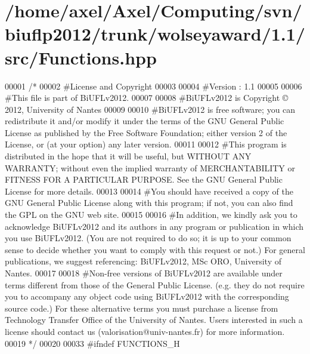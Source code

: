 \hypertarget{Functions_8hpp_source}{\section{/home/axel/\-Axel/\-Computing/svn/biuflp2012/trunk/wolseyaward/1.1/src/\-Functions.hpp}
}

\begin{DoxyCode}
00001 \textcolor{comment}{/*}
00002 \textcolor{comment}{ #License and Copyright}
00003 \textcolor{comment}{ }
00004 \textcolor{comment}{ #Version : 1.1}
00005 \textcolor{comment}{ }
00006 \textcolor{comment}{ #This file is part of BiUFLv2012.}
00007 \textcolor{comment}{ }
00008 \textcolor{comment}{ #BiUFLv2012 is Copyright © 2012, University of Nantes}
00009 \textcolor{comment}{ }
00010 \textcolor{comment}{ #BiUFLv2012 is free software; you can redistribute it and/or modify it under
       the terms of the GNU General Public License as published by the Free Software
       Foundation; either version 2 of the License, or (at your option) any later version.}
00011 \textcolor{comment}{ }
00012 \textcolor{comment}{ #This program is distributed in the hope that it will be useful, but WITHOUT
       ANY WARRANTY; without even the implied warranty of MERCHANTABILITY or FITNESS FOR
       A PARTICULAR PURPOSE. See the GNU General Public License for more details.}
00013 \textcolor{comment}{ }
00014 \textcolor{comment}{ #You should have received a copy of the GNU General Public License along with
       this program; if not, you can also find the GPL on the GNU web site.}
00015 \textcolor{comment}{ }
00016 \textcolor{comment}{ #In addition, we kindly ask you to acknowledge BiUFLv2012 and its authors in
       any program or publication in which you use BiUFLv2012. (You are not required to
       do so; it is up to your common sense to decide whether you want to comply with
       this request or not.) For general publications, we suggest referencing: 
       BiUFLv2012, MSc ORO, University of Nantes.}
00017 \textcolor{comment}{ }
00018 \textcolor{comment}{ #Non-free versions of BiUFLv2012 are available under terms different from
       those of the General Public License. (e.g. they do not require you to accompany any
       object code using BiUFLv2012 with the corresponding source code.) For these
       alternative terms you must purchase a license from Technology Transfer Office of the
       University of Nantes. Users interested in such a license should contact us
       (valorisation@univ-nantes.fr) for more information.}
00019 \textcolor{comment}{ */}
00020 
00033 \textcolor{preprocessor}{#ifndef FUNCTIONS\_H}

\end{DoxyCode}
